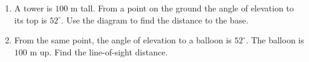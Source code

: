 \documentclass{article}\usepackage{graphicx,enumitem}
\begin{document}
\begin{enumerate}[leftmargin=*, itemsep=5cm]
  \item A tower is $100$ m tall. From a point on the ground the angle of
    elevation to its top is $52^\circ$. Use the diagram to find the distance
    to the base.
    \begin{center}
    \end{center}
  \item From the same point, the angle of elevation to a balloon is
    $52^\circ$. The balloon is $100$ m up. Find the line-of-sight distance.
\end{enumerate}
\end{document}
